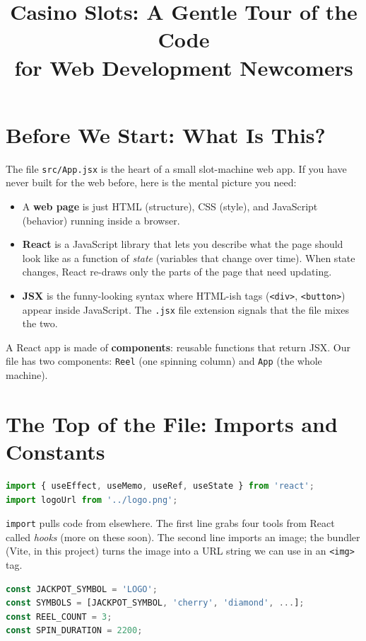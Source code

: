 \documentclass[11pt]{article}
\title{Casino Slots: A Gentle Tour of the Code\\for Web Development Newcomers}
\author{}
\date{}
\begin{document}
\maketitle

\section{Before We Start: What Is This?}

The file \texttt{src/App.jsx} is the heart of a small slot-machine web app.
If you have never built for the web before, here is the mental picture you need:

\begin{itemize}
  \item A \textbf{web page} is just HTML (structure), CSS (style), and JavaScript (behavior) running inside a browser.
  \item \textbf{React} is a JavaScript library that lets you describe what the page should look like as a function of \emph{state} (variables that change over time). When state changes, React re-draws only the parts of the page that need updating.
  \item \textbf{JSX} is the funny-looking syntax where HTML-ish tags (\texttt{<div>}, \texttt{<button>}) appear inside JavaScript. The \texttt{.jsx} file extension signals that the file mixes the two.
\end{itemize}

A React app is made of \textbf{components}: reusable functions that return JSX.
Our file has two components: \texttt{Reel} (one spinning column) and \texttt{App} (the whole machine).

\section{The Top of the File: Imports and Constants}

\begin{lstlisting}[language=JavaScript]
import { useEffect, useMemo, useRef, useState } from 'react';
import logoUrl from '../logo.png';
\end{lstlisting}

\texttt{import} pulls code from elsewhere. The first line grabs four tools from React
called \emph{hooks} (more on these soon). The second line imports an image;
the bundler (Vite, in this project) turns the image into a URL string we can use in an \texttt{<img>} tag.

\begin{lstlisting}[language=JavaScript]
const JACKPOT_SYMBOL = 'LOGO';
const SYMBOLS = [JACKPOT_SYMBOL, 'cherry', 'diamond', ...];
const REEL_COUNT = 3;
const SPIN_DURATION = 2200;
\end{lstlisting}
\end{document}
